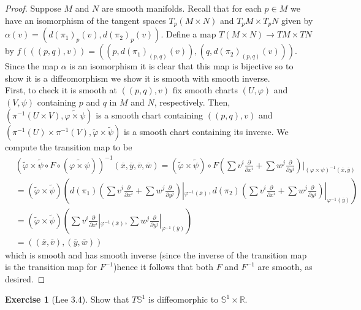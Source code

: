 \documentclass{article}
\newcommand{\bR}{\mathbb{R}}
\newcommand{\vp}{\varphi}
\newcommand{\bS}{\mathbb{S}}
\theoremstyle{definition}
\newtheorem{exercise}{Exercise}
\begin{document}
\begin{proof}
    Suppose $M$ and $N$ are smooth manifolds. Recall that for each $p \in M$ we have an isomorphism of the tangent spaces $T_p(M \times N)$ and $T_p M \times T_p N$ given by $\alpha(v) = (d(\pi_1)_p(v), d(\pi_2)_p(v))$. Define a map $T(M \times N) \to T M \times TN$ by $f (((p,q), v)) = ( (p, d(\pi_1)_{(p,q)} (v)), (q, d(\pi_2)_{(p,q)}(v)))$. Since the map $\alpha$ is an isomorphism it is clear that this map is bijective so to show it is a diffeomorphism we show it is smooth with smooth inverse. \\ 
    First, to check it is smooth at $((p,q), v)$ fix smooth charts $(U, \vp)$ and $(V, \psi)$ containing $p$ and $q$ in $M$ and $N$, respectively. Then, $(\pi^{-1}(U \times V), \widetilde{\vp \times \psi})$ is a smooth chart containing $((p,q), v)$ and $(\pi^{-1}(U) \times \pi^{-1}(V), \tilde{\vp} \times \tilde{\psi})$ is a smooth chart containing its inverse. We compute the transition map to be 
    \begin{align*}
        & (\tilde{\vp} \times \tilde{\psi} \circ F \circ (\widetilde{\vp \times \psi}))^{-1}(\overline{x}, \overline{y}, \overline{v}, \overline{w}) = (\tilde{\vp} \times \tilde{\psi}) \circ F \left( \sum v^i \frac{\partial}{\partial x^i} + \sum w^j \frac{\partial}{\partial y^j} \right)|_{(\vp \times \psi)^{-1}(\overline{x}, \overline{y})} \\ 
         & = (\tilde{\vp} \times \tilde{\psi})\left(d(\pi_1)\left(\sum v^i \frac{\partial}{\partial x^i} + \sum w^j \frac{\partial}{\partial y^j} \right)|_{\vp^{-1}(\overline{x})}, d(\pi_2)\left(\sum v^i \frac{\partial}{\partial x^i} + \sum w^j \frac{\partial}{\partial y^j} \right)|_{\vp^{-1}(\overline{y})}\right) \\
         & = (\tilde{\vp} \times \tilde{\psi})\left(\sum v^i \frac{\partial}{\partial x^i}|_{\vp^{-1}(\overline{x})}, \sum w^j \frac{\partial}{\partial y^j}|_{\vp^{-1}(\overline{y})}\right) \\ 
         & = ((\overline{x}, \overline{v}), (\overline{y}, \overline{w})) 
    \end{align*}
    which is smooth and has smooth inverse (since the inverse of the transition map is the transition map for $F^{-1}$)hence it follows that both $F$ and $F^{-1}$ are smooth, as desired. 
\end{proof}

\begin{exercise}[Lee 3.4]
    Show that $T \bS^1$ is diffeomorphic to $\bS^1 \times \bR$. 
\end{exercise}
\end{document}
